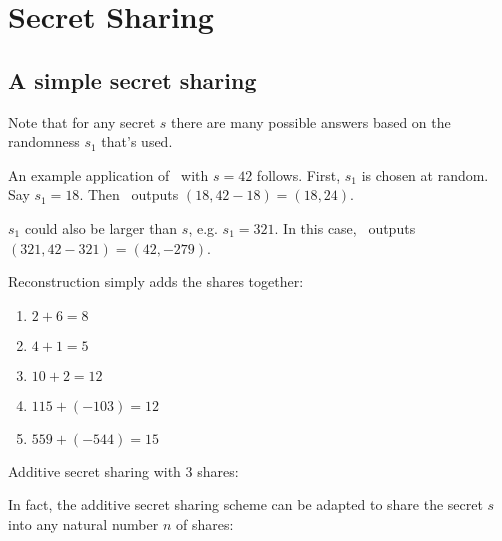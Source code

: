 \section{Secret Sharing}

\subsection{A simple secret sharing}
\begin{sampleA}
    Note that for any secret $s$ there are many possible answers based on the 
    randomness $s_1$ that's used. 
    
    An example application of \share~with $s=42$ follows. First, $s_1$ is 
    chosen at random. Say $s_1=18$. Then \share~outputs $(18,42-18)=(18,24)$.

    $s_1$ could also be larger than $s$, e.g. $s_1 = 321$. In this case, 
    \share~outputs $(321,42-321)=(42,-279)$.
\end{sampleA}

\begin{answer}
    Reconstruction simply adds the shares together:
    \renewcommand{\labelenumi}{(\alph{enumi})} 
    \begin{enumerate}
        \item $2+6=8$
        \item $4+1=5$
        \item $10+2=12$
        \item $115+(-103)=12$
        \item $559+(-544)=15$
    \end{enumerate}
\end{answer}

\begin{answer} Additive secret sharing with 3 shares:
    \begin{pchstack}[center]
    \end{pchstack}

    In fact, the additive secret sharing scheme can be adapted to share 
    the secret $s$ into any natural number $n$ of shares:
    \begin{pchstack}[center]
    \end{pchstack}

\end{answer}

